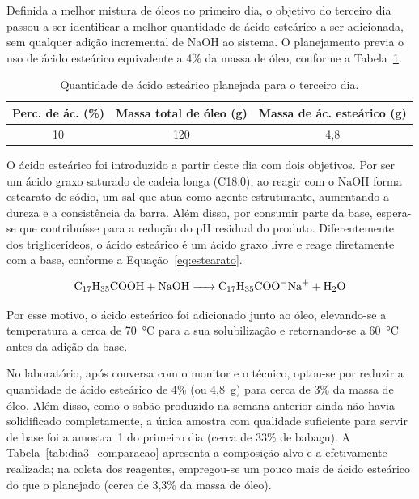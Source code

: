 Definida a melhor mistura de óleos no primeiro dia, o objetivo do terceiro dia passou a ser identificar a melhor quantidade de ácido esteárico a ser adicionada, sem qualquer adição incremental de NaOH ao sistema. O planejamento previa o uso de ácido esteárico equivalente a 4\% da massa de óleo, conforme a Tabela~\ref{tab:dia3_planejado}.

\begin{table}[H]
    \centering
    \footnotesize
    \caption{Quantidade de ácido esteárico planejada para o terceiro dia.}
    \label{tab:dia3_planejado}
    \begin{tabular}{ccc}
        \toprule
        \textbf{Perc. de ác. (\%)} & \textbf{Massa total de óleo (g)} & \textbf{Massa de ác. esteárico (g)} \\
        \midrule
        10 & 120 & 4,8 \\
        \bottomrule
    \end{tabular}
\end{table}

O ácido esteárico foi introduzido a partir deste dia com dois objetivos. Por ser um ácido graxo saturado de cadeia longa (C18:0), ao reagir com o NaOH forma estearato de sódio, um sal que atua como agente estruturante, aumentando a dureza e a consistência da barra. Além disso, por consumir parte da base, espera-se que contribuísse para a redução do pH residual do produto. Diferentemente dos triglicerídeos, o ácido esteárico é um ácido graxo livre e reage diretamente com a base, conforme a Equação~\ref{eq:estearato}.

\begin{equation}
    \ce{C17H35COOH + NaOH -> C17H35COO^{-}Na^{+} + H2O}
    \label{eq:estearato}
\end{equation}

Por esse motivo, o ácido esteárico foi adicionado junto ao óleo, elevando-se a temperatura a cerca de 70~°C para a sua solubilização e retornando-se a 60~°C antes da adição da base.

No laboratório, após conversa com o monitor e o técnico, optou-se por reduzir a quantidade de ácido esteárico de 4\% (ou 4,8~g) para cerca de 3\% da massa de óleo. Além disso, como o sabão produzido na semana anterior ainda não havia solidificado completamente, a única amostra com qualidade suficiente para servir de base foi a amostra~1 do primeiro dia (cerca de 33\% de babaçu). A Tabela~\ref{tab:dia3_comparacao} apresenta a composição-alvo e a efetivamente realizada; na coleta dos reagentes, empregou-se um pouco mais de ácido esteárico do que o planejado (cerca de 3,3\% da massa de óleo).

